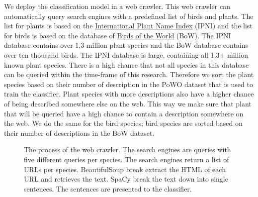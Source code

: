 \documentclass[a4paper, 12pt, oneside]{book} %
\begin{document}
We deploy the classification model in a web crawler.
This web crawler can automatically query search engines with a predefined list of birds and plants.
The list for plants is based on the \href{https://www.ipni.org/}{International Plant Name Index} (IPNI) and the list for birds is based on the database of \href{https://birdsoftheworld.org/bow/home}{Birds of the World} (BoW).
The IPNI database contains over 1,3 million plant species and the BoW database contains over ten thousand birds.
The IPNI database is large, containing all 1,3+ million known plant species.
There is a high chance that not all species in this database can be queried within the time-frame of this research.
Therefore we sort the plant species based on their number of description in the PoWO dataset that is used to train the classifier.
Plant species with more descriptions also have a higher chance of being described somewhere else on the web.
This way we make sure that plant that will be queried have a high chance to contain a description somewhere on the web.
We do the same for the bird species; bird species are sorted based on their number of descriptions in the BoW dataset.

\begin{figure} [t]
    \centering
    \caption[Web Crawler]{The process of the web crawler. The search engines are queries with five different queries per species. The search engines return a list of URLs per species. BeautifulSoup break extract the HTML of each URL and retrieves the text. SpaCy break the text down into single sentences. The sentences are presented to the classifier.}
    \label{fig:webcrawler}
\end{figure}
\end{document}
